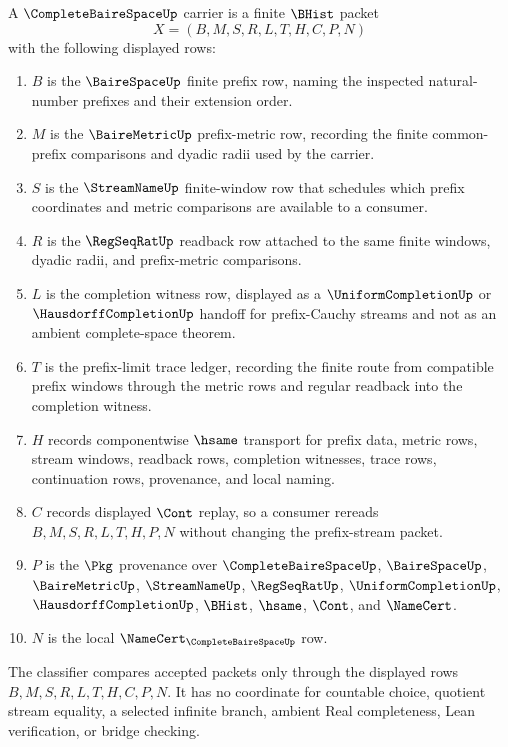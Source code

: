 \begin{definition}
\label{def:complete-baire-space-carrier}
A $\CompleteBaireSpaceUp$ carrier is a finite $\BHist$ packet
$$
X=(B,M,S,R,L,T,H,C,P,N)
$$
with the following displayed rows:
\begin{enumerate}
\item $B$ is the $\BaireSpaceUp$ finite prefix row, naming the inspected natural-number prefixes and their extension order.
\item $M$ is the $\BaireMetricUp$ prefix-metric row, recording the finite common-prefix comparisons and dyadic radii used by the carrier.
\item $S$ is the $\StreamNameUp$ finite-window row that schedules which prefix coordinates and metric comparisons are available to a consumer.
\item $R$ is the $\RegSeqRatUp$ readback row attached to the same finite windows, dyadic radii, and prefix-metric comparisons.
\item $L$ is the completion witness row, displayed as a $\UniformCompletionUp$ or $\HausdorffCompletionUp$ handoff for prefix-Cauchy streams and not as an ambient complete-space theorem.
\item $T$ is the prefix-limit trace ledger, recording the finite route from compatible prefix windows through the metric rows and regular readback into the completion witness.
\item $H$ records componentwise $\hsame$ transport for prefix data, metric rows, stream windows, readback rows, completion witnesses, trace rows, continuation rows, provenance, and local naming.
\item $C$ records displayed $\Cont$ replay, so a consumer rereads $B,M,S,R,L,T,H,P,N$ without changing the prefix-stream packet.
\item $P$ is the $\Pkg$ provenance over $\CompleteBaireSpaceUp$, $\BaireSpaceUp$, $\BaireMetricUp$, $\StreamNameUp$, $\RegSeqRatUp$, $\UniformCompletionUp$, $\HausdorffCompletionUp$, $\BHist$, $\hsame$, $\Cont$, and $\NameCert$.
\item $N$ is the local $\NameCert_{\CompleteBaireSpaceUp}$ row.
\end{enumerate}
The classifier compares accepted packets only through the displayed rows $B,M,S,R,L,T,H,C,P,N$. It has no coordinate for countable choice, quotient stream equality, a selected infinite branch, ambient Real completeness, Lean verification, or bridge checking.
\end{definition}

